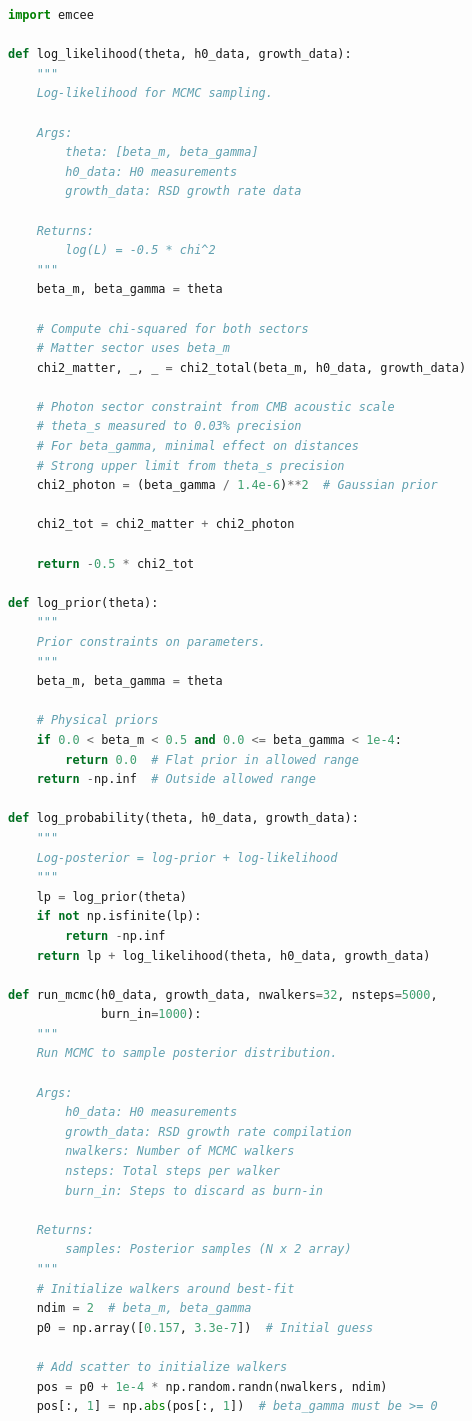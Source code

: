 \documentclass[11pt]{article}
\begin{document}
\begin{lstlisting}[language=Python]
import emcee

def log_likelihood(theta, h0_data, growth_data):
    """
    Log-likelihood for MCMC sampling.
    
    Args:
        theta: [beta_m, beta_gamma]
        h0_data: H0 measurements
        growth_data: RSD growth rate data
    
    Returns:
        log(L) = -0.5 * chi^2
    """
    beta_m, beta_gamma = theta
    
    # Compute chi-squared for both sectors
    # Matter sector uses beta_m
    chi2_matter, _, _ = chi2_total(beta_m, h0_data, growth_data)
    
    # Photon sector constraint from CMB acoustic scale
    # theta_s measured to 0.03% precision
    # For beta_gamma, minimal effect on distances
    # Strong upper limit from theta_s precision
    chi2_photon = (beta_gamma / 1.4e-6)**2  # Gaussian prior
    
    chi2_tot = chi2_matter + chi2_photon
    
    return -0.5 * chi2_tot

def log_prior(theta):
    """
    Prior constraints on parameters.
    """
    beta_m, beta_gamma = theta
    
    # Physical priors
    if 0.0 < beta_m < 0.5 and 0.0 <= beta_gamma < 1e-4:
        return 0.0  # Flat prior in allowed range
    return -np.inf  # Outside allowed range

def log_probability(theta, h0_data, growth_data):
    """
    Log-posterior = log-prior + log-likelihood
    """
    lp = log_prior(theta)
    if not np.isfinite(lp):
        return -np.inf
    return lp + log_likelihood(theta, h0_data, growth_data)

def run_mcmc(h0_data, growth_data, nwalkers=32, nsteps=5000, 
             burn_in=1000):
    """
    Run MCMC to sample posterior distribution.
    
    Args:
        h0_data: H0 measurements
        growth_data: RSD growth rate compilation
        nwalkers: Number of MCMC walkers
        nsteps: Total steps per walker
        burn_in: Steps to discard as burn-in
    
    Returns:
        samples: Posterior samples (N x 2 array)
    """
    # Initialize walkers around best-fit
    ndim = 2  # beta_m, beta_gamma
    p0 = np.array([0.157, 3.3e-7])  # Initial guess
    
    # Add scatter to initialize walkers
    pos = p0 + 1e-4 * np.random.randn(nwalkers, ndim)
    pos[:, 1] = np.abs(pos[:, 1])  # beta_gamma must be >= 0
    

\end{lstlisting}
\end{document}
